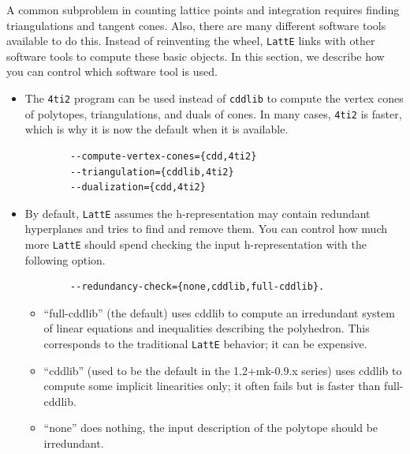 \documentclass{article}
\newcommand{\latte}{{\tt LattE}\xspace}
\newcommand{\fourtitwo}{{\tt 4ti2}\xspace}
\begin{document}
A common subproblem in counting lattice points and integration requires finding triangulations and tangent cones. Also, there are many different software tools available to do this. Instead of reinventing the wheel, \latte links with other software tools to compute these basic objects. In this section, we describe how you can control which software tool is used.

\begin{itemize}
\item The \fourtitwo program can be used instead of {\tt cddlib} %
  to compute the vertex cones of polytopes, triangulations, and duals of cones.
  In many cases, \fourtitwo is faster, which is why it is now the default when
  it is available.
  
  \begin{verbatim}
        --compute-vertex-cones={cdd,4ti2}
        --triangulation={cddlib,4ti2}
        --dualization={cdd,4ti2}
  \end{verbatim}

\item By default, \latte assumes the h-representation may contain redundant hyperplanes and tries to find and remove them. You can control how much more \latte should spend checking the input h-representation with the following option.

        \begin{verbatim}
        --redundancy-check={none,cddlib,full-cddlib}.
        \end{verbatim}

        \begin{itemize}
        \item ``full-cddlib'' (the default) uses cddlib to compute an irredundant
    system of linear equations and inequalities describing the
    polyhedron.  This corresponds to the traditional \latte behavior;
    it can be expensive.

        \item ``cddlib'' (used to be the default in the 1.2+mk-0.9.x series) uses
    cddlib to compute some implicit linearities only; it often fails
    but is faster than full-cddlib.

        \item ``none'' does nothing, the input description of the polytope should
    be irredundant.
                
        \end{itemize}

\end{itemize}
\end{document}
